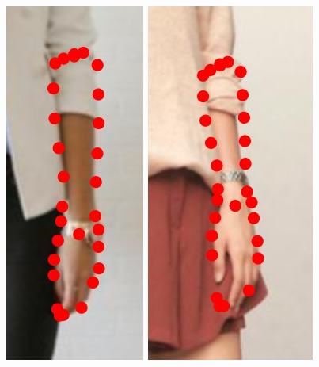 \begin{figure}
    \hfill
    \includegraphics[height=\ofh]{resources/Annotation_Correction/Suplementory_Meterial/ExFit/0037}
    \hfill
    \includegraphics[height=\ofh]{resources/Annotation_Correction/Suplementory_Meterial/ExFit/0038}
    \hfill

\end{figure}
